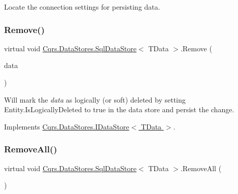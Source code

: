 Locate the connection settings for persisting data. 

\mbox{\label{classCqrs_1_1DataStores_1_1SqlDataStore_a898d15db199f054865a96ac646bf54fb}} 
\subsubsection{\texorpdfstring{Remove()}{Remove()}}
{\footnotesize\ttfamily virtual void \hyperlink{classCqrs_1_1DataStores_1_1SqlDataStore}{Cqrs.\+Data\+Stores.\+Sql\+Data\+Store}$<$ T\+Data $>$.Remove (\begin{DoxyParamCaption}\item[{T\+Data}]{data }\end{DoxyParamCaption})\hspace{0.3cm}{\ttfamily [virtual]}}



Will mark the {\itshape data}  as logically (or soft) deleted by setting Entity.\+Is\+Logically\+Deleted to true in the data store and persist the change. 



Implements \hyperlink{interfaceCqrs_1_1DataStores_1_1IDataStore_a7ef540796bbe4257296841590bc23478}{Cqrs.\+Data\+Stores.\+I\+Data\+Store$<$ T\+Data $>$}.

\mbox{\label{classCqrs_1_1DataStores_1_1SqlDataStore_abb88337dccf3d5372f6b0920d5d26ebd}} 
\subsubsection{\texorpdfstring{Remove\+All()}{RemoveAll()}}
{\footnotesize\ttfamily virtual void \hyperlink{classCqrs_1_1DataStores_1_1SqlDataStore}{Cqrs.\+Data\+Stores.\+Sql\+Data\+Store}$<$ T\+Data $>$.Remove\+All (\begin{DoxyParamCaption}{ }\end{DoxyParamCaption})\hspace{0.3cm}{\ttfamily [virtual]}}



